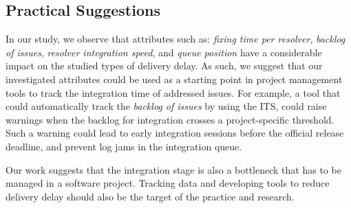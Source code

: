 \subsection{Practical Suggestions}

In our study, we observe that attributes such as: \textit{fixing time per
resolver}, \textit{backlog of issues}, \textit{resolver integration speed}, and
\textit{queue position} have a considerable impact on the studied types of
delivery delay. As such, we suggest that our investigated attributes could be
used as a starting point in project management tools to track the integration
time of addressed issues. For example, a tool that could automatically track the
\textit{backlog of issues} by using the ITS, could raise warnings when the
backlog for integration crosses a project-specific threshold. Such a warning
could lead to early integration sessions before the official release deadline,
and prevent log jams in the integration queue. 

Our work suggests that the integration stage is also a bottleneck that has to be
managed in a software project. Tracking data and developing tools to reduce
delivery delay should also be the target of the practice and research.

